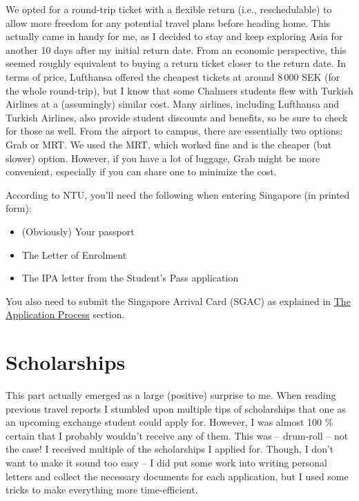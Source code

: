 We opted for a round-trip ticket with a flexible return (i.e., reschedulable) to allow more freedom for any potential travel plans before heading home. This actually came in handy for me, as I decided to stay and keep exploring Asia for another 10 days after my initial return date. From an economic perspective, this seemed roughly equivalent to buying a return ticket closer to the return date. In terms of price, Lufthansa offered the cheapest tickets at around 8\,000 SEK (for the whole round-trip), but I know that some Chalmers students flew with Turkish Airlines at a (assumingly) similar cost. Many airlines, including Lufthansa and Turkish Airlines, also provide student discounts and benefits, so be sure to check for those as well. From the airport to campus, there are essentially two options: Grab or MRT. We used the MRT, which worked fine and is the cheaper (but slower) option. However, if you have a lot of luggage, Grab might be more convenient, especially if you can share one to minimize the cost.

\hrulefill

According to NTU, you'll need the following when entering Singapore (in printed form):
\begin{itemize}
    \item (Obviously) Your passport
    \item The Letter of Enrolment
    \item The IPA letter from the Student's Pass application
\end{itemize}
You also need to submit the Singapore Arrival Card (SGAC) as explained in \hyperref[app]{The Application Process} section.
\section*{Scholarships}
{}
This part actually emerged as a large (positive) surprise to me. When reading previous travel reports I stumbled upon multiple tips of scholarships that one as an upcoming exchange student could apply for. However, I was almost 100 \% certain that I probably wouldn't receive any of them. This was -- drum-roll -- not the case! I received multiple of the scholarships I applied for. Though, I don't want to make it sound too easy -- I did put some work into writing personal letters and collect the necessary documents for each application, but I used some tricks to make everything more time-efficient.

